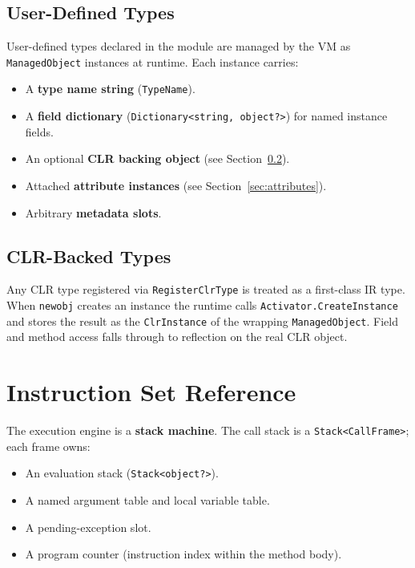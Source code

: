 \documentclass[11pt,a4paper]{article}
\newcommand{\code}[1]{\texttt{\small #1}}
\newcommand{\typename}[1]{\textcolor{typecolor}{\texttt{\small #1}}}
\begin{document}
\subsection{User-Defined Types}

User-defined types declared in the module are managed by the VM as
\typename{ManagedObject} instances at runtime. Each instance carries:

\begin{itemize}[leftmargin=1.8em]
  \item A \textbf{type name string} (\code{TypeName}).
  \item A \textbf{field dictionary} (\code{Dictionary<string, object?>}) for
    named instance fields.
  \item An optional \textbf{CLR backing object} (see
    Section~\ref{sec:clrtype}).
  \item Attached \textbf{attribute instances} (see
    Section~\ref{sec:attributes}).
  \item Arbitrary \textbf{metadata slots}.
\end{itemize}

\subsection{CLR-Backed Types}
\label{sec:clrtype}

Any CLR type registered via \code{RegisterClrType} is treated as a
first-class IR type. When \texttt{newobj} creates an instance the runtime
calls \code{Activator.CreateInstance} and stores the result as the
\code{ClrInstance} of the wrapping \typename{ManagedObject}. Field and
method access falls through to reflection on the real CLR object.

\section{Instruction Set Reference}
\label{sec:isa}

The execution engine is a \textbf{stack machine}. The call stack is a
\code{Stack<CallFrame>}; each frame owns:

\begin{itemize}[leftmargin=1.8em, noitemsep]
  \item An evaluation stack (\code{Stack<object?>}).
  \item A named argument table and local variable table.
  \item A pending-exception slot.
  \item A program counter (instruction index within the method body).
\end{itemize}
\end{document}
